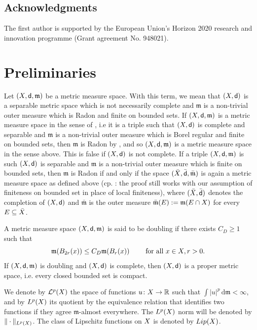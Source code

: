 \documentclass[12pt]{amsart}
\newcommand{\R}{\mathbb{R}}
\newcommand{\sfd}{{\sf d}}
\renewcommand{\d}{{\mathrm d}}
\newcommand{\X}{{\rm X}}
\newcommand{\Lip}{{\rm Lip}}
\newcommand{\mm}{\mathfrak m}
\theoremstyle{definition}
\newcommand{\calL}[1]{\mathcal{L}^{#1}}
\begin{document}
\subsection{Acknowledgments}
The first author is supported by the European Union’s Horizon 2020 research and innovation programme (Grant
agreement No. 948021).
%
\section{Preliminaries}
\label{sec:preliminaries}

Let $(\X,\sfd,\mm)$ be a metric measure space. With this term, we mean that $(\X,\sfd)$ is a separable metric space which is not necessarily complete and $\mm$ is a non-trivial outer measure which is Radon and finite on bounded sets. If $(\X,\sfd,\mm)$ is a metric measure space in the sense of \cite[p.62]{HKST15}, i.e it is a triple such that
$(\X,\sfd)$ is complete and separable and $\mm$ is a non-trivial outer measure which is Borel regular and finite on bounded sets, then $\mm$ is Radon by \cite[Proposition 3.3.44]{HKST15}, and so $(\X,\sfd,\mm)$ is a metric measure space in the sense above. This is false if $(\X,\sfd)$ is not complete.
If a triple $(\X,\sfd,\mm)$ is such $(\X,\sfd)$ is separable and $\mm$ is a non-trivial outer measure which is finite on bounded sets, then $\mm$ is Radon if and only if the space $(\bar{\X},\bar{\sfd},\bar{\mm})$ is again a metric measure space as defined above (cp. \cite[Proposition 3.3.46]{HKST15}: the proof still works with our assumption of finiteness on bounded set in place of local finiteness), where $(\bar{\X},\bar{\sfd})$ denotes the completion of $(\X,\sfd)$ and $\bar{\mm}$ is the outer measure $\bar{\mm}(E) := \mm(E\cap \X)$ for every $E\subseteq \bar{\X}$.

A metric measure space $(\X,\sfd,\mm)$ is said to be doubling if there exists $C_D \ge 1$ such that
\begin{equation}
    \label{eq:defin_doubling_measure}
    \mm(B_{2r}(x)) \le C_D \mm(B_r(x)) \qquad \text{ for all } x\in \X, r>0.
\end{equation}
If $(\X,\sfd,\mm)$ is doubling and $(\X,\sfd)$ is complete, then $(\X,\sfd)$ is a proper metric space, i.e. every closed bounded set is compact.

We denote by $\calL{p}(\X)$ the space of functions $u\colon \X \to \R$ such that $\int \vert u \vert^p \,\d \mm < \infty$, and by $L^p(\X)$ its quotient by the equivalence relation that identifies two functions if they agree $\mm$-almost everywhere. The $L^p(\X)$ norm will be denoted by $\Vert \cdot \Vert_{L^p(\X)}$. The class of Lipschitz functions on $\X$ is denoted by $\Lip(\X)$.
\end{document}
